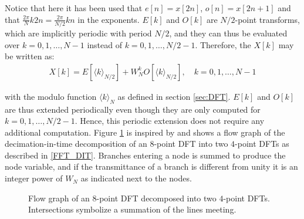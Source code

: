 Notice that here it has been used that $e[n] = x[2n]$, $o[n] = x[2n+1]$ and that $\frac{2\pi}{N} k2n = \frac{2\pi}{N/2} kn$ in the exponents. $E[k]$ and $O[k]$ are $N/2$-point transforms, which are implicitly periodic with period $N/2$, and they can thus be evaluated over $k = 0, 1, \dots, N-1$ instead of $k = 0, 1, \dots, N/2-1$. Therefore, the $X[k]$ may be written as:
\begin{align} \label{FFT_modulo}
X[k] = E[\langle k\rangle_{N/2}] + W_N^k O[\langle k\rangle_{N/2}], \quad k = 0, 1, \dots, N-1
\end{align}

with the modulo function $\langle k \rangle_N$ as defined in section \ref{sec:DFT}. $E[k]$ and $O[k]$ are thus extended periodically even though they are only computed for $k = 0, 1, \dots, N/2-1$. Hence, this periodic extension does not require any additional computation. Figure \ref{fig:4} is inspired by \cite{figure 4, DTSP} and shows a flow graph of the decimation-in-time decomposition of an $8$-point DFT into two $4$-point DFTs as described in \eqref{FFT_DIT}. Branches entering a node is summed to produce the node variable, and if the transmittance of a branch is different from unity it is an integer power of $W_N$ as indicated next to the nodes.

\begin{figure}
\centering
{}
\caption{Flow graph of an $8$-point DFT decomposed into two $4$-point DFTs. Intersections symbolize a summation of the lines meeting.}
\label{fig:4}
\end{figure}

